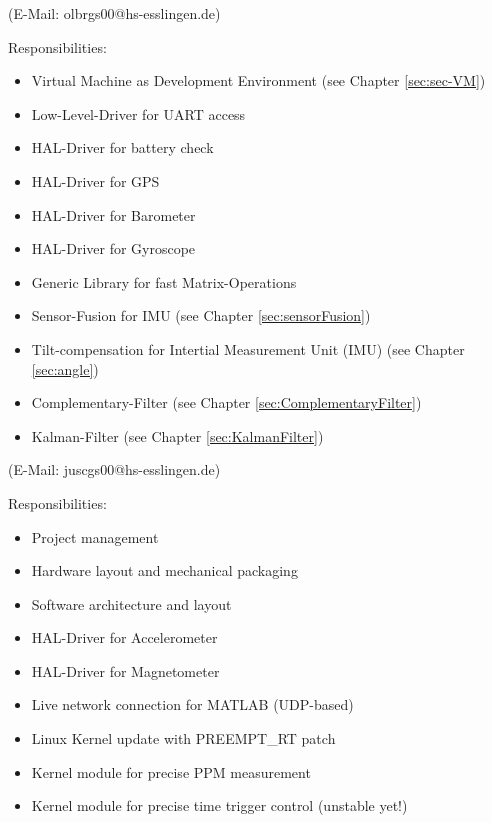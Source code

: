 (E-Mail: olbrgs00@hs-esslingen.de)

Responsibilities:
\begin{itemize}
	\item Virtual Machine as Development Environment (see Chapter \ref{sec:sec-VM})
	\item Low-Level-Driver for UART access
	\item HAL-Driver for battery check
	\item HAL-Driver for GPS
	\item HAL-Driver for Barometer
	\item HAL-Driver for Gyroscope
	\item Generic Library for fast Matrix-Operations
	\item Sensor-Fusion for IMU (see Chapter \ref{sec:sensorFusion})
	\item Tilt-compensation for Intertial Measurement Unit (IMU) (see Chapter \ref{sec:angle})
	\item Complementary-Filter (see Chapter \ref{sec:ComplementaryFilter})
	\item Kalman-Filter (see Chapter \ref{sec:KalmanFilter})
\end{itemize}

\vspace{0.5cm}

 (E-Mail: juscgs00@hs-esslingen.de)

Responsibilities:
\begin{itemize}
	\item Project management
	\item Hardware layout and mechanical packaging
	\item Software architecture and layout
	\item HAL-Driver for Accelerometer
	\item HAL-Driver for Magnetometer
	\item Live network connection for MATLAB (UDP-based)
	\item Linux Kernel update with PREEMPT\_RT patch
	\item Kernel module for precise PPM measurement
	\item Kernel module for precise time trigger control (unstable yet!)
\end{itemize}


